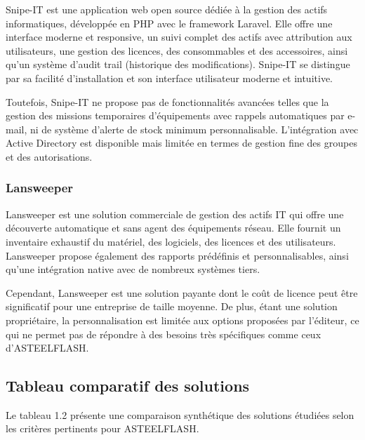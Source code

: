 Snipe-IT est une application web open source dédiée à la gestion des actifs informatiques, développée en PHP avec le framework Laravel. Elle offre une interface moderne et responsive, un suivi complet des actifs avec attribution aux utilisateurs, une gestion des licences, des consommables et des accessoires, ainsi qu'un système d'audit trail (historique des modifications). Snipe-IT se distingue par sa facilité d'installation et son interface utilisateur moderne et intuitive.

Toutefois, Snipe-IT ne propose pas de fonctionnalités avancées telles que la gestion des missions temporaires d'équipements avec rappels automatiques par e-mail, ni de système d'alerte de stock minimum personnalisable. L'intégration avec Active Directory est disponible mais limitée en termes de gestion fine des groupes et des autorisations.

\subsubsection{Lansweeper}

Lansweeper est une solution commerciale de gestion des actifs IT qui offre une découverte automatique et sans agent des équipements réseau. Elle fournit un inventaire exhaustif du matériel, des logiciels, des licences et des utilisateurs. Lansweeper propose également des rapports prédéfinis et personnalisables, ainsi qu'une intégration native avec de nombreux systèmes tiers.

Cependant, Lansweeper est une solution payante dont le coût de licence peut être significatif pour une entreprise de taille moyenne. De plus, étant une solution propriétaire, la personnalisation est limitée aux options proposées par l'éditeur, ce qui ne permet pas de répondre à des besoins très spécifiques comme ceux d'ASTEELFLASH.

\subsection{Tableau comparatif des solutions}

Le tableau 1.2 présente une comparaison synthétique des solutions étudiées selon les critères pertinents pour ASTEELFLASH.

